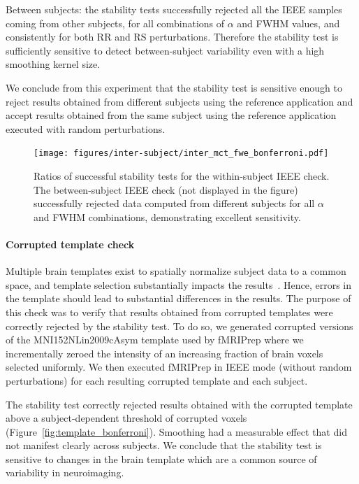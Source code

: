 \documentclass[lettersize,journal]{IEEEtran}
\newcommand{\fmriprep}{fMRIPrep\xspace}
\begin{document}
Between subjects: the stability tests successfully rejected all the IEEE samples coming from other subjects, for all combinations of $\alpha$ and FWHM values, and consistently for both RR and RS perturbations. Therefore the stability test is sufficiently sensitive to detect between-subject variability even with a high smoothing kernel size.

We conclude from this experiment that the stability test is sensitive enough to reject results obtained from different subjects using the reference application and accept results obtained from the same subject using the reference application executed with random perturbations.

\begin{figure}
  \centering
  \texttt{[image: figures/inter-subject/inter\_mct\_fwe\_bonferroni.pdf]}
  \caption{Ratios of successful stability tests for the within-subject IEEE check. The between-subject IEEE check (not displayed in the figure) successfully rejected data computed from different subjects for all $\alpha$ and FWHM combinations, demonstrating excellent sensitivity.
  }
  \label{fig:ieee-check}
\end{figure}

\paragraph{Corrupted template check}

Multiple brain templates exist to spatially normalize subject data to a common space, and template selection substantially impacts the results~\cite{li2021moving}. Hence, errors in the template should lead to substantial differences in the results. The purpose of this check was to verify that results obtained from corrupted templates were correctly rejected by the stability test.
To do so, we generated corrupted versions of the MNI152NLin2009cAsym template used by \fmriprep where we incrementally zeroed the intensity of an increasing fraction of brain voxels selected uniformly. We then executed \fmriprep in IEEE mode (without random perturbations) for each resulting corrupted template and each subject.

The stability test correctly rejected results obtained with the corrupted template above a subject-dependent threshold of corrupted voxels (Figure~\ref{fig:template_bonferroni}). Smoothing had a measurable effect that did not manifest clearly across subjects. We conclude that the stability test is sensitive to changes in the brain template which are a common source of variability in neuroimaging.
\end{document}
